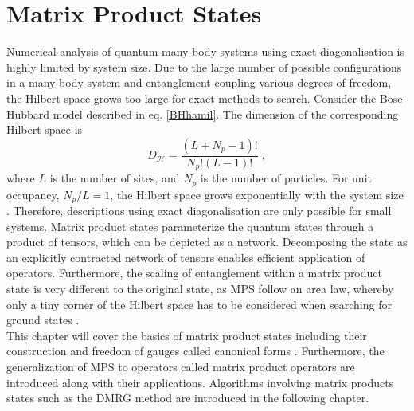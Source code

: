 \chapter{Matrix Product States} \label{chap:MPS}
Numerical analysis of quantum many-body systems using exact diagonalisation is highly limited by system size. Due to the large number of possible configurations in a many-body system and entanglement coupling various degrees of freedom, the Hilbert space grows too large for exact methods to search.
Consider the Bose-Hubbard model described in eq. \eqref{BHhamil}. The dimension of the corresponding Hilbert space is
\begin{equation}
	D_{\mathcal{H}} = \frac{(L+N_p -1)!}{N_p ! (L-1)!} \; ,
\end{equation}
where $L$ is the number of sites, and $N_p$ is the number of particles. For unit occupancy, $N_p / L = 1$, the Hilbert space grows exponentially with the system size \cite{Dong}. Therefore, descriptions using exact diagonalisation are only possible for small systems.
Matrix product states parameterize the quantum states through a product of tensors, which can be depicted as a network. Decomposing the state as an explicitly contracted network of tensors enables efficient application of operators. Furthermore, the scaling of entanglement within a matrix product state is very different to the original state, as MPS follow an area law, whereby only a tiny corner of the Hilbert space has to be considered when searching for ground states \cite{Cramer}.\\
This chapter will cover the basics of matrix product states including their construction and freedom of gauges called canonical forms \cite{schollwock}. Furthermore, the generalization of MPS to operators called matrix product operators are introduced along with their applications. Algorithms involving matrix products states such as the DMRG method \cite{White1992,White1993} are introduced in the following chapter.


